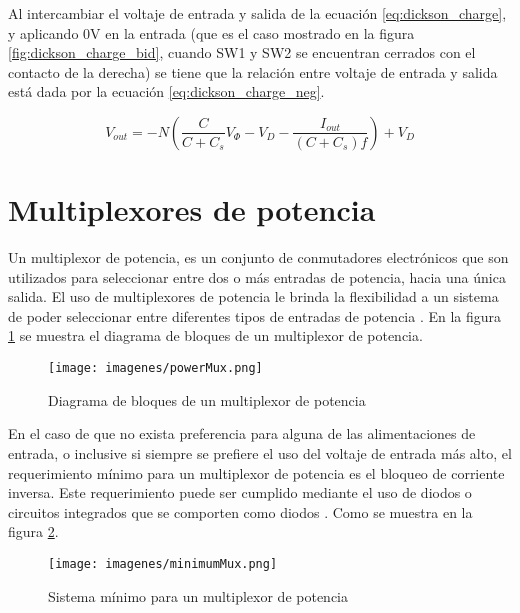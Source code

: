     Al intercambiar el voltaje de entrada y salida de la ecuación \ref{eq:dickson_charge},
    y aplicando $0$V en la entrada (que es el caso mostrado en la figura 
    \ref{fig:dickson_charge_bid}, cuando SW1 y SW2 se encuentran cerrados 
    con el contacto de la derecha) se tiene que la relación entre voltaje de entrada
    y salida está dada por la ecuación \ref{eq:dickson_charge_neg}.

    \begin{equation}
        V_{out} = - N \left (  \frac{C}{C+C_s}V_\Phi - V_D - 
        \frac{I_{out}}{(C+C_s)f} \right ) + V_D
        \label{eq:dickson_charge_neg}
    \end{equation}


\section{Multiplexores de potencia}

Un multiplexor de potencia, es un conjunto de conmutadores electrónicos que son utilizados
para seleccionar entre dos o más entradas de potencia, hacia una única salida. El uso de 
multiplexores de potencia le brinda la flexibilidad a un sistema de poder seleccionar
entre diferentes tipos de entradas de potencia \cite{triano_basics_2020}. En la figura 
\ref{fig:powerMux} se muestra el diagrama de bloques de un multiplexor de potencia.


\begin{figure}[H]
    \centering
    \texttt{[image: imagenes/powerMux.png]}
    \caption{Diagrama de bloques de un multiplexor de potencia \cite{triano_basics_2020}}
    \label{fig:powerMux}
\end{figure}


En el caso de que no exista preferencia para alguna de las alimentaciones de entrada, o inclusive
si siempre se prefiere el uso del voltaje de entrada más alto, el requerimiento mínimo para un multiplexor
de potencia es el bloqueo de corriente inversa. Este requerimiento puede ser cumplido mediante el uso de 
diodos o circuitos integrados que se comporten como diodos \cite{triano_basics_2020}.  Como se muestra en la figura \ref{fig:muxDiode}.

\begin{figure}[H]
    \centering
    \texttt{[image: imagenes/minimumMux.png]}
    \caption{Sistema mínimo para un multiplexor de potencia \cite{triano_basics_2020}}
    \label{fig:muxDiode}
\end{figure}

